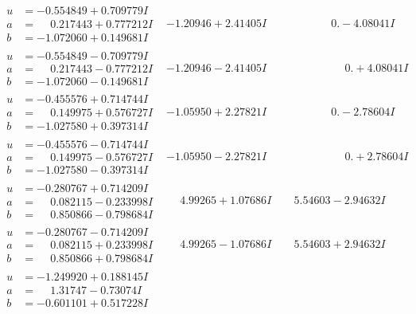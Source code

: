 \documentclass[1p]{elsarticle_modified}
\theoremstyle{definition}
\begin{document}
$$\begin{array}{c|c|c}
\begin{aligned}
u &= -0.554849 + 0.709779 I \\
a &= \phantom{-}0.217443 + 0.777212 I \\
b &= -1.072060 + 0.149681 I\end{aligned}
 & -1.20946 + 2.41405 I & \phantom{-0.000000 } 0. - 4.08041 I \\ \hline\begin{aligned}
u &= -0.554849 - 0.709779 I \\
a &= \phantom{-}0.217443 - 0.777212 I \\
b &= -1.072060 - 0.149681 I\end{aligned}
 & -1.20946 - 2.41405 I & \phantom{-0.000000 -}0. + 4.08041 I \\ \hline\begin{aligned}
u &= -0.455576 + 0.714744 I \\
a &= \phantom{-}0.149975 + 0.576727 I \\
b &= -1.027580 + 0.397314 I\end{aligned}
 & -1.05950 + 2.27821 I & \phantom{-0.000000 } 0. - 2.78604 I \\ \hline\begin{aligned}
u &= -0.455576 - 0.714744 I \\
a &= \phantom{-}0.149975 - 0.576727 I \\
b &= -1.027580 - 0.397314 I\end{aligned}
 & -1.05950 - 2.27821 I & \phantom{-0.000000 -}0. + 2.78604 I \\ \hline\begin{aligned}
u &= -0.280767 + 0.714209 I \\
a &= \phantom{-}0.082115 - 0.233998 I \\
b &= \phantom{-}0.850866 - 0.798684 I\end{aligned}
 & \phantom{-}4.99265 + 1.07686 I & \phantom{-}5.54603 - 2.94632 I \\ \hline\begin{aligned}
u &= -0.280767 - 0.714209 I \\
a &= \phantom{-}0.082115 + 0.233998 I \\
b &= \phantom{-}0.850866 + 0.798684 I\end{aligned}
 & \phantom{-}4.99265 - 1.07686 I & \phantom{-}5.54603 + 2.94632 I \\ \hline\begin{aligned}
u &= -1.249920 + 0.188145 I \\
a &= \phantom{-}1.31747 - 0.73074 I \\
b &= -0.601101 + 0.517228 I\end{aligned}

\end{array}$$
\end{document}
